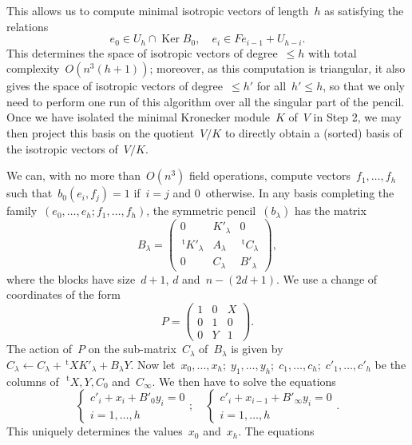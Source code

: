 \documentclass{lms}%
\def\transpose{\,{}^{\mathrm{t}\!}}
\def\mat#1{\begin{pmatrix}#1\end{pmatrix}}
\DeclareMathOperator\Ker{Ker}
\begin{document}
This allows us to compute minimal isotropic vectors of length~$h$ as
satisfying the relations
\begin{equation}\label{eq:m.i.v.-matrix}
e_0 ∈ U_{h} ∩ \Ker B_0, \quad e_{i} ∈ F e_{i-1} + U_{h-i}.
\end{equation}
This determines the space of isotropic vectors of degree~$≤ h$ with
total complexity~$O(n^3 (h+1))$; moreover, as this computation is
triangular, it also gives the space of isotropic vectors of degree~$≤ h'$
for all~$h' ≤ h$, so that we only need to perform one run of this
algorithm over all the singular part of the pencil. Once we have isolated
the minimal Kronecker module~$K$ of~$V$ in Step 2, we may then project
this basis on the quotient~$V/K$ to directly obtain a (sorted) basis of
the isotropic vectors of~$V/K$.

We can, with no more than~$O(n^3)$ field operations, compute
vectors~$f_1,…,f_h$ such that~$b_0(e_i, f_j) = 1$ if~$i = j$ and
$0$~otherwise.
In any basis completing the family~$(e_0, …, e_h; f_1, …, f_h)$,
the symmetric pencil~$(b_{λ})$ has the matrix
\begin{equation}\label{eq:matrix-b1}
B_{λ} = \mat{0 & K'_{λ} & 0\\\transpose{K'_{λ}} & A_{λ}&\transpose{C_{λ}}\\
  0 & C_{λ} & B'_{λ}},
\end{equation}
where the blocks have size~$d+1$, $d$ and~$n-(2d+1)$. We use a change of
coordinates of the form
\begin{equation}\label{eq:p1}
P = \mat{1 & 0 & X\\0&1&0\\0&Y&1}.
\end{equation}
The action of~$P$ on the sub-matrix~$C_{λ}$ of~$B_{λ}$ is given by $C_{λ}
← C_{λ} + \transpose{X} K'_{λ} + B_{λ} Y$. Now let~$x_0,…,x_{h};\;
y_1,…,y_h;\; c_1,…,c_h;\; c'_1,…,c'_h$ be the columns of~$\transpose{X}, Y,
C_0$ and~$C_{∞}$. We then have to
solve the equations
\begin{equation}\label{eq:chvar-x}
\begin{cases} c'_i + x_i + B'_0 y_i = 0\\ i = 1,…,h\end{cases};\quad
\begin{cases} c'_i + x_{i-1} + B'_∞ y_i = 0\\i=1,…,h\end{cases}.
\end{equation}
This uniquely determines the values~$x_0$ and~$x_{h}$. The equations
\end{document}
